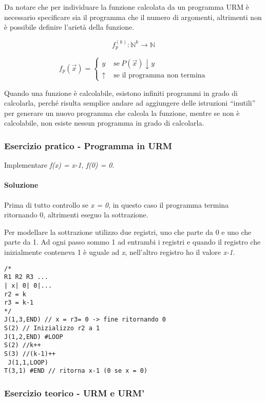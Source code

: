 Da notare che per individuare la funzione calcolata da un programma URM è necessario specificare sia il programma che il numero di argomenti, altrimenti non è possibile definire l'arietà della funzione.

$$
f_{p}^{(k)} : \mathbb{N}^k \rightarrow \mathbb{N}
$$

$$
f_p(\vec{x}) = 
\begin{cases}
y &\text{ se} \: P(\vec{x})\downarrow y \\
\uparrow &\text{ se il programma non termina}
\end{cases}
$$

Quando una funzione è calcolabile, esistono infiniti programmi in grado di calcolarla, perché risulta semplice andare ad aggiungere delle istruzioni ``inutili'' per generare un nuovo programma che calcola la funzione, mentre se non è calcolabile, non esiste nessun programma in grado di calcolarla.

\subsubsection{Esercizio pratico - Programma in URM}

Implementare \emph{f(x) = x-1, f(0) = 0}.

\paragraph{Soluzione}

Prima di tutto controllo se \textit{x = 0}, in questo caso il programma termina ritornando 0, altrimenti eseguo la sottrazione.

Per modellare la sottrazione utilizzo due registri, uno che parte da 0 e uno che parte da 1. Ad ogni passo sommo 1 ad entrambi i registri e quando il registro che inizialmente conteneva 1 è uguale ad \textit{x}, nell'altro registro ho il valore \textit{x-1}.

\begin{lstlisting}[language=URM]
/*
R1 R2 R3 ...
| x| 0| 0|...
r2 = k
r3 = k-1
*/
J(1,3,END) // x = r3= 0 -> fine ritornando 0
S(2) // Inizializzo r2 a 1
J(1,2,END) #LOOP
S(2) //k++
S(3) //(k-1)++
 J(1,1,LOOP)
T(3,1) #END // ritorna x-1 (0 se x = 0)
\end{lstlisting}

\subsubsection{Esercizio teorico - URM e URM'}\label{ueu}

